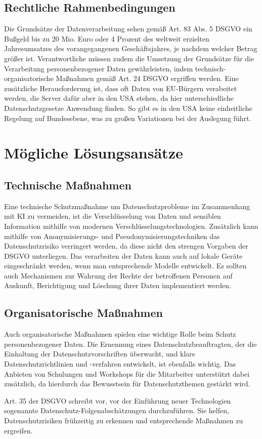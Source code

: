 \cite{keyed2024}

\subsection{Rechtliche Rahmenbedingungen}

Die Grundsätze der Datenverarbeitung sehen gemäß Art. 83 Abs. 5 DSGVO ein
Bußgeld bis zu 20 Mio. Euro oder 4 Prozent des weltweit erzielten Jahresumsatzes
des vorangegangenen Geschäftsjahres, je nachdem welcher Betrag größer ist.
Verantwortliche müssen zudem die Umsetzung der Grundsätze für die Verarbeitung
personenbezogener Daten gewährleisten, indem technisch-organisatorische
Maßnahmen gemäß Art. 24 DSGVO ergriffen werden. Eine zusätzliche Herausforderung
ist, dass oft Daten von EU-Bürgern verabeitet werden, die Server dafür aber in
den USA stehen, da hier unterschiedliche Datenschutzgesetze Anwendung finden. So
gibt es in den USA keine einheitliche Regelung auf Bundesebene, was zu großen
Variationen bei der Auslegung führt.
\cite{keyed2024}

\section{Mögliche Lösungsansätze}

\subsection{Technische Maßnahmen}

Eine technische Schutzmaßnahme um Datenschutzprobleme im Zusammenhang mit KI zu
vermeiden, ist die Verschlüsselung von Daten und sensiblen Information mithilfe
von modernen Verschlüsselungstechnologien. Zusätzlich kann mithilfe von
Anonymisierungs- und Pseudonymisierungstechniken das Datenschutzrisiko
verringert werden, da diese nicht den strengen Vorgaben der DSGVO unterliegen.
Das verarbeiten der Daten kann auch auf lokale Geräte eingeschränkt werden, wenn
man entsprechende Modelle entwickelt. Es sollten auch Mechanismen zur Wahrung
der Rechte der betroffenen Personen auf Auskunft, Berichtigung und Löschung
ihrer Daten implementiert werden.

\cite{conrad_2017}
\cite{mindverse2024}

\subsection{Organisatorische Maßnahmen}

Auch organisatorische Maßnahmen spielen eine wichtige Rolle beim Schutz
personenbezogener Daten. Die Ernennung eines Datenschutzbeauftragten, der die
Einhaltung der Datenschutzvorschriften überwacht, und klare
Datenschutzrichtlinien und -verfahren entwickelt, ist ebenfalls wichtig. Das
Anbieten von Schulungen und Workshops für die Mitarbeiter unterstützt dabei
zusätzlich, da hierdurch das Bewusstsein für Datenschutzthemen gestärkt wird.

Art. 35 der DSGVO schreibt vor, vor der Einführung neuer Technologien sogenannte
Datenschutz-Folgenabschätzungen durchzuführen. Sie helfen, Datenschutzrisiken
frühzeitig zu erkennen und entsprechende Maßnahmen zu ergreifen.

\cite{conrad_2017}